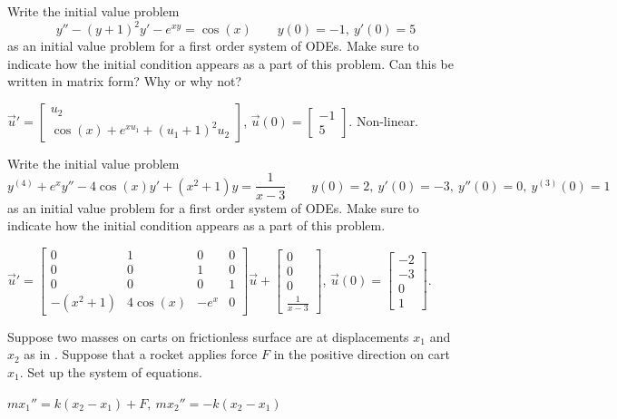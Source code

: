 \begin{exercise}
Write the initial value problem 
\[ y'' - (y+1)^2 y' - e^{xy} = \cos(x) \qquad y(0) = -1,\ y'(0) = 5 \] as an initial value problem for a first order system of ODEs. Make sure to indicate how the initial condition appears as a part of this problem. Can this be written in matrix form? Why or why not?
\end{exercise}
\comboSol{%
}
{%
$\vec{u}' = \left[\begin{smallmatrix}  u_2 \\ \cos(x) + e^{xu_1} + (u_1 + 1)^2u_2 \end{smallmatrix}\right]$, $\vec{u}(0) = \left[\begin{smallmatrix}  -1 \\ 5 \end{smallmatrix}\right]$. Non-linear.
}

\begin{exercise}
Write the initial value problem 
\[ y^{(4)} + e^x y'' - 4\cos(x)y' + (x^2 + 1)y = \frac{1}{x-3} \qquad y(0) = 2,\ y'(0) = -3,\ y''(0) = 0,\ y^{(3)}(0) = 1 \] as an initial value problem for a first order system of ODEs. Make sure to indicate how the initial condition appears as a part of this problem. 
\end{exercise}
\comboSol{%
}
{%
$\vec{u}' = \left[\begin{smallmatrix}  0 & 1 & 0 & 0 \\ 0 & 0 & 1 & 0 \\ 0 & 0 & 0 & 1 \\ -(x^2 + 1) & 4\cos(x) & -e^x & 0 \end{smallmatrix}\right] \vec{u} + \left[\begin{smallmatrix} 0 \\ 0 \\ 0 \\ \frac{1}{x-3} \end{smallmatrix}\right]$, $\vec{u}(0) = \left[\begin{smallmatrix} -2 \\ -3 \\ 0 \\ 1 \end{smallmatrix}\right]$.
}

\begin{exercise}
Suppose two masses on carts on frictionless surface are at 
displacements $x_1$ and $x_2$ as in .
Suppose that a rocket applies force $F$ in the positive direction on cart
$x_1$.  Set up the system of equations.
\end{exercise}
\comboSol{%
}
{%
$mx_1'' = k(x_2 - x_1) + F,\ mx_2''  =-k(x_2 - x_1)$
}

